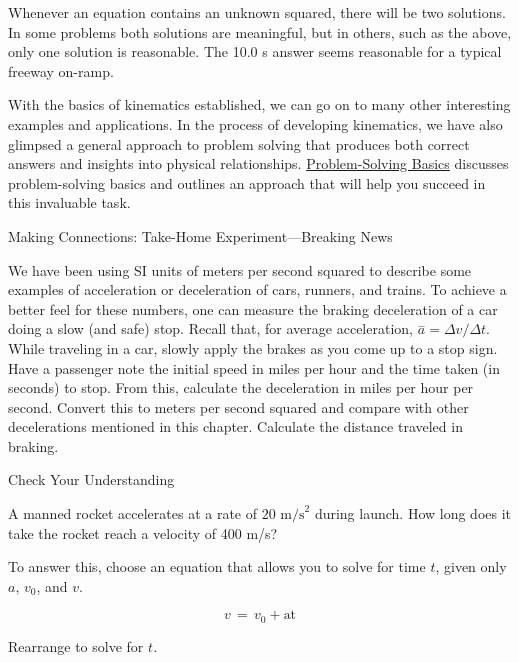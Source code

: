 \documentclass[
]{book}
\newenvironment{note}{}{}
\begin{document}
Whenever an equation contains an unknown squared, there will be two
solutions. In some problems both solutions are meaningful, but in
others, such as the above, only one solution is reasonable. The 10.0 s
answer seems reasonable for a typical freeway on-ramp.

With the basics of kinematics established, we can go on to many other
interesting examples and applications. In the process of developing
kinematics, we have also glimpsed a general approach to problem solving
that produces both correct answers and insights into physical
relationships. \href{/m54774}{Problem-Solving Basics} discusses
problem-solving basics and outlines an approach that will help you
succeed in this invaluable task.

\hypertarget{fs-id1164906508057}{}
\begin{note}

Making Connections: Take-Home Experiment---Breaking News

We have been using SI units of meters per second squared to describe
some examples of acceleration or deceleration of cars, runners, and
trains. To achieve a better feel for these numbers, one can measure the
braking deceleration of a car doing a slow (and safe) stop. Recall that,
for average acceleration, \({\overset{-}{a} = {\Delta v/\Delta t}}{}\).
While traveling in a car, slowly apply the brakes as you come up to a
stop sign. Have a passenger note the initial speed in miles per hour and
the time taken (in seconds) to stop. From this, calculate the
deceleration in miles per hour per second. Convert this to meters per
second squared and compare with other decelerations mentioned in this
chapter. Calculate the distance traveled in braking.

\end{note}

\hypertarget{fs-id1164906434690}{}
Check Your Understanding

\leavevmode\hypertarget{fs-id1164906434693}{}%
A manned rocket accelerates at a rate of \(\text{20\ m/s}^{2}{}\) during
launch. How long does it take the rocket reach a velocity of 400 m/s?

\leavevmode\hypertarget{fs-id1164906458555}{}%
To answer this, choose an equation that allows you to solve for time
\emph{\(t{}\)}, given only \(a{}\), \(v_{0}{}\), and \(v{}\).

\leavevmode\hypertarget{import-auto-id2168910}{}%
\[{v\, = \, v_{0} + \text{at}}{}\]

Rearrange to solve for \(t{}\)\emph{.}
\end{document}
